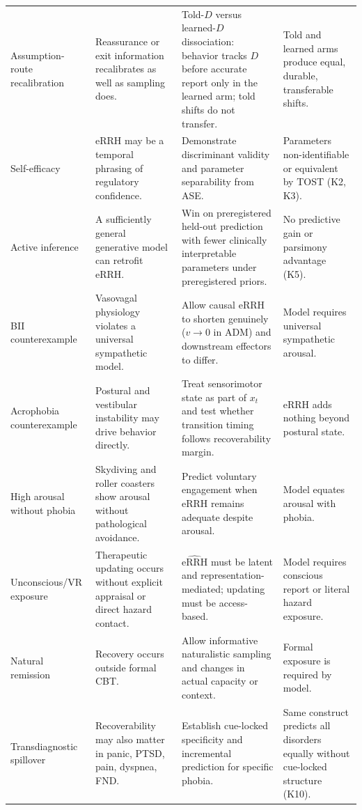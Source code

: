 \documentclass[9pt,twocolumn]{article}
\newcommand{\eRRHhat}{\widehat{\mathrm{eRRH}}}
\begin{document}
\begin{table}[!t]
\begin{tabularx}{\textwidth}{p{}X X p{}}
Assumption-route recalibration & Reassurance or exit information recalibrates as well as sampling does. & Told-$D$ versus learned-$D$ dissociation: behavior tracks $D$ before accurate report only in the learned arm; told shifts do not transfer. & Told and learned arms produce equal, durable, transferable shifts. \\
Self-efficacy & eRRH may be a temporal phrasing of regulatory confidence. & Demonstrate discriminant validity and parameter separability from ASE. & Parameters non-identifiable or equivalent by TOST (K2, K3). \\
Active inference & A sufficiently general generative model can retrofit eRRH. & Win on preregistered held-out prediction with fewer clinically interpretable parameters under preregistered priors. & No predictive gain or parsimony advantage (K5). \\
BII counterexample & Vasovagal physiology violates a universal sympathetic model. & Allow causal eRRH to shorten genuinely ($v\to0$ in ADM) and downstream effectors to differ. & Model requires universal sympathetic arousal. \\
Acrophobia counterexample & Postural and vestibular instability may drive behavior directly. & Treat sensorimotor state as part of $x_t$ and test whether transition timing follows recoverability margin. & eRRH adds nothing beyond postural state. \\
High arousal without phobia & Skydiving and roller coasters show arousal without pathological avoidance. & Predict voluntary engagement when eRRH remains adequate despite arousal. & Model equates arousal with phobia. \\
Unconscious/VR exposure & Therapeutic updating occurs without explicit appraisal or direct hazard contact. & $\eRRHhat$ must be latent and representation-mediated; updating must be access-based. & Model requires conscious report or literal hazard exposure. \\
Natural remission & Recovery occurs outside formal CBT. & Allow informative naturalistic sampling and changes in actual capacity or context. & Formal exposure is required by model. \\
Transdiagnostic spillover & Recoverability may also matter in panic, PTSD, pain, dyspnea, FND. & Establish cue-locked specificity and incremental prediction for specific phobia. & Same construct predicts all disorders equally without cue-locked structure (K10). \\
\bottomrule
\end{tabularx}
\end{table}
\end{document}
